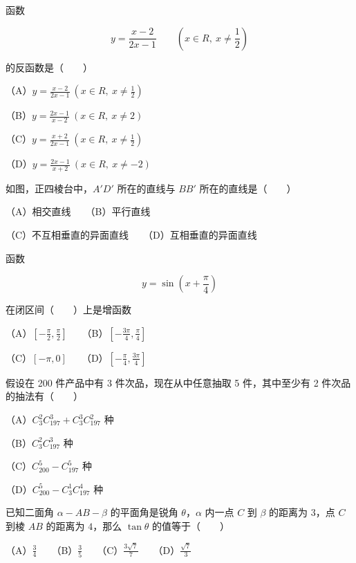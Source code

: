 \begin{question}
函数

\nopagebreak[4]
\[
y=\frac{x-2}{2x-1}\qquad\left(x\in R,\ x\ne\frac12\right)
\]

的反函数是\mbox{（　　）}

（A）$y=\frac{x-2}{2x-1}\ (x\in R,\ x\ne\frac12)$

（B）$y=\frac{2x-1}{x-2}\ (x\in R,\ x\ne2)$

（C）$y=\frac{x+2}{2x-1}\ (x\in R,\ x\ne\frac12)$

（D）$y=\frac{2x-1}{x+2}\ (x\in R,\ x\ne-2)$

\Needspace{0.4\textheight}
\end{question}
\begin{question}
如图，正四棱台中，$A'D'$ 所在的直线与 $BB'$ 所在的直线是\mbox{（　　）}
\nopagebreak[4]
\begin{center}\end{center}
\nopagebreak[4]
（A）相交直线　　（B）平行直线

（C）不互相垂直的异面直线　　（D）互相垂直的异面直线

\end{question}
\begin{question}
函数

\nopagebreak[4]
\[
y=\sin\left(x+\frac\pi4\right)
\]

在闭区间\mbox{（　　）}上是增函数

（A）$\left[-\frac\pi2,\frac\pi2\right]$　　（B）$\left[-\frac{3\pi}{4},\frac\pi4\right]$

（C）$[-\pi,0]$　　（D）$\left[-\frac\pi4,\frac{3\pi}{4}\right]$

\end{question}
\begin{question}
假设在 200 件产品中有 3 件次品，现在从中任意抽取 5 件，其中至少有 2 件次品的抽法有\mbox{（　　）}

（A）$C_3^2C_{197}^3+C_3^3C_{197}^2$ 种

（B）$C_3^2C_{197}^3$ 种

（C）$C_{200}^5-C_{197}^5$ 种

（D）$C_{200}^5-C_3^1C_{197}^4$ 种

\end{question}
\begin{question}
已知二面角 $\alpha-AB-\beta$ 的平面角是锐角 $\theta$，$\alpha$ 内一点 $C$ 到 $\beta$ 的距离为 $3$，点 $C$ 到棱 $AB$ 的距离为 $4$，那么 $\tan\theta$ 的值等于\mbox{（　　）}

（A）$\frac34$　　（B）$\frac35$　　（C）$\frac{3\sqrt7}{7}$　　（D）$\frac{\sqrt7}{3}$

\end{question}
